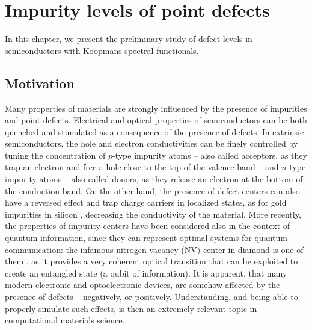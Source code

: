 \cleardoublepage
\chapter{Impurity levels of point defects\label{ch:defects}}
In this chapter, we present the preliminary study of defect levels in semiconductors with Koopmans spectral functionals. 

\clearpage
\section{Motivation\label{sec:motivation-defects}}
Many properties of materials are strongly influenced by the presence of impurities and point defects. Electrical and optical properties of semiconductors can be both quenched and stimulated as a consequence of the presence of defects. In extrinsic semiconductors, the hole and electron conductivities can be finely controlled by tuning the concentration of $p$-type impurity atoms -- also called acceptors, as they trap an electron and free a hole close to the top of the valence band -- and $n$-type impurity atoms -- also called donors, as they release an electron at the bottom of the conduction band. On the other hand, the presence of defect centers can also have a reversed effect and trap charge carriers in localized states, as for gold impurities in silicon \cite{corsetti_negative-u_2014}, decreasing the conductivity of the material. More recently, the properties of impurity centers have been considered also in the context of quantum information, since they can represent optimal systems for quantum communication: the infamous nitrogen-vacancy (NV) center in diamond is one of them \cite{maze_properties_2011}, as it provides a very coherent optical transition that can be exploited to create an entangled state (a qubit of information). It is apparent, that many modern electronic and optoelectronic devices, are somehow affected by the presence of defects -- negatively, or positively. Understanding, and being able to properly simulate such effects, is then an extremely relevant topic in computational materials science.

